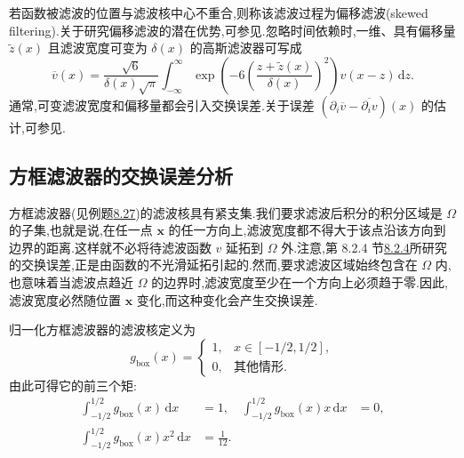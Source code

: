 \begin{note}[非恒定滤波宽度与偏移滤波]
\label{note:variable-width-skewed-filter}
若函数被滤波的位置与滤波核中心不重合,则称该滤波过程为偏移滤波(skewed filtering).关于研究偏移滤波的潜在优势,可参见\parencite{VanderBosGeurts2005}.忽略时间依赖时,一维、具有偏移量 $\widetilde{z}(x)$ 且滤波宽度可变为 $\delta(x)$ 的高斯滤波器可写成
\[
 \overline{v}(x)
  =\frac{\sqrt{6}}{\delta(x)\sqrt{\pi}}
    \int_{-\infty}^{\infty}
      \exp\!\left(-6\left(
        \frac{z+\widetilde{z}(x)}{\delta(x)}
      \right)^2\right)v(x-z)\,\mathrm{d}z.
\]
通常,可变滤波宽度和偏移量都会引入交换误差.关于误差
$(\partial_i\overline{v}-\overline{\partial_i v})(x)$ 的估计,可参见\parencite{BerselliGrisantiJohn2007}.
\end{note}

\subsection{方框滤波器的交换误差分析}
\label{subsec:box-filter-commutation-error}

\begin{note}[使用方框滤波器的动机]
\label{note:box-filter-motivation}
方框滤波器(见例题\hyperref[ex:box-filter]{8.27})的滤波核具有紧支集.我们要求滤波后积分的积分区域是 $\Omega$ 的子集,也就是说,在任一点 $\bm{x}$ 的任一方向上,滤波宽度都不得大于该点沿该方向到边界的距离.这样就不必将待滤波函数 $v$ 延拓到 $\Omega$ 外.注意,第 8.2.4 节\hyperref[subsec:gaussian-filter-commutation-error]{8.2.4}所研究的交换误差,正是由函数的不光滑延拓引起的.然而,要求滤波区域始终包含在 $\Omega$ 内,也意味着当滤波点趋近 $\Omega$ 的边界时,滤波宽度至少在一个方向上必须趋于零.因此,滤波宽度必然随位置 $\bm{x}$ 变化,而这种变化会产生交换误差.
\end{note}

\begin{note}[归一化方框滤波器]
\label{note:normalized-box-filter}
归一化方框滤波器的滤波核定义为
\[
 g_{\mathrm{box}}(x)=
 \begin{cases}
  1,&x\in[-1/2,1/2],\\
  0,&\text{其他情形}.
 \end{cases}
\]
由此可得它的前三个矩:
\[
\begin{aligned}
 \int_{-1/2}^{1/2}g_{\mathrm{box}}(x)\,\mathrm{d}x&=1,
 &\int_{-1/2}^{1/2}g_{\mathrm{box}}(x)x\,\mathrm{d}x&=0,\\
 \int_{-1/2}^{1/2}g_{\mathrm{box}}(x)x^2\,\mathrm{d}x&=\frac{1}{12}.
\end{aligned}
\]
\end{note}

